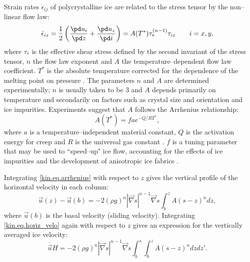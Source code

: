 Strain rates $\dot{\epsilon}_{ij}$ of polycrystalline ice are related to the stress tensor by the non--linear flow law:
\begin{equation}
  \label{kin.eq.flowlaw}
  \dot{\epsilon}_{iz}=\frac12\left(\frac{\pd u_i}{\pd z}+\frac{\pd u_z}{\pd i}\right)=A(T^\ast)\tau_\ast^{(n-1)}\tau_{iz}\qquad i=x,y,
\end{equation}
where $\tau_\ast$ is the effective shear stress defined by the second invariant of the stress tensor, $n$ the flow law exponent and $A$ the temperature--dependent flow law coefficient. $T^\ast$ is the absolute temperature corrected for the dependence of the melting point on pressure \cite[$T^\ast=T+8.7\cdot10^{-4}(H+h-z)$, $T$ in Kelvin,][]{Huybrechts1986}. 
The parameters $n$ and $A$ are determined experimentally; $n$ is usually taken to be 3 and $A$ depends primarily on temperature and secondarily on factors such as crystal
size and orientation and ice impurities. 
Experiments suggest that $A$ follows the Arrhenius relationship:
\begin{equation}
  \label{kin.eq.arrhenius}
  A(T^\ast)=fae^{-Q/RT^\ast},
\end{equation}where $a$ is a temperature--independent material constant, $Q$ is the activation energy for creep and $R$ is the universal gas constant \citep{Paterson1994}. 
$f$ is a tuning parameter that may be used to ``speed--up" ice flow, accounting for the effects of ice impurities and the development of anisotropic ice fabrics \citep{Payne1999,Tarasov1999,Tarasov2000,Peltier2000}.

Integrating \eqref{kin.eq.arrhenius} with respect to $z$ gives the vertical profile of the horizontal velocity in each column:
\begin{equation}
  \label{kin.eq.horiz_velo}
  \vec u(z)-\vec u(b) = -2(\rho g)^n|\vec\nabla s|^{n-1}\vec\nabla s\int_b^zA(s-z)^ndz,
\end{equation}
where $\vec u(b)$ is the basal velocity (sliding velocity). Integrating \eqref{kin.eq.horiz_velo} again with respect to $z$ gives an expression for the vertically averaged ice velocity:
\begin{equation}
  \label{kin.eq.avg_velo}
  \overline{\vec u}H=-2(\rho g)^n|\vec\nabla s|^{n-1}\vec\nabla s\int_b^s\int_b^zA(s-z)^ndzdz'.
\end{equation}

